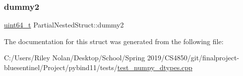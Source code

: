 \mbox{\label{struct_partial_nested_struct_a404444062ccd6ac2b1d86bfa8ac0220a}} 
\subsubsection{\texorpdfstring{dummy2}{dummy2}}
{\footnotesize\ttfamily \mbox{\hyperlink{_s_d_l__config_8h_aaa5d1cd013383c889537491c3cfd9aad}{uint64\+\_\+t}} Partial\+Nested\+Struct\+::dummy2}



The documentation for this struct was generated from the following file\+:\begin{DoxyCompactItemize}
\item 
C\+:/\+Users/\+Riley Nolan/\+Desktop/\+School/\+Spring 2019/\+C\+S4850/git/finalproject-\/bluesentinel/\+Project/pybind11/tests/\mbox{\hyperlink{test__numpy__dtypes_8cpp}{test\+\_\+numpy\+\_\+dtypes.\+cpp}}\end{DoxyCompactItemize}
